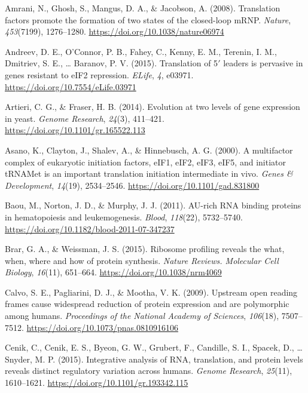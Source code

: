 \documentclass[12pt,openany]{book}
\begin{document}
\hypertarget{ref-Amrani2008}{}
Amrani, N., Ghosh, S., Mangus, D. A., \& Jacobson, A. (2008).
Translation factors promote the formation of two states of the
closed-loop mRNP. \emph{Nature}, \emph{453}(7199), 1276--1280.
\url{https://doi.org/10.1038/nature06974}

\hypertarget{ref-Andreev2015}{}
Andreev, D. E., O'Connor, P. B., Fahey, C., Kenny, E. M., Terenin, I.
M., Dmitriev, S. E., \ldots{} Baranov, P. V. (2015). Translation of
5\({'}\) leaders is pervasive in genes resistant to eIF2 repression.
\emph{ELife}, \emph{4}, e03971.
\url{https://doi.org/10.7554/eLife.03971}

\hypertarget{ref-Artieri2014}{}
Artieri, C. G., \& Fraser, H. B. (2014). Evolution at two levels of gene
expression in yeast. \emph{Genome Research}, \emph{24}(3), 411--421.
\url{https://doi.org/10.1101/gr.165522.113}

\hypertarget{ref-Asano2000}{}
Asano, K., Clayton, J., Shalev, A., \& Hinnebusch, A. G. (2000). A
multifactor complex of eukaryotic initiation factors, eIF1, eIF2, eIF3,
eIF5, and initiator tRNAMet is an important translation initiation
intermediate in vivo. \emph{Genes \& Development}, \emph{14}(19),
2534--2546. \url{https://doi.org/10.1101/gad.831800}

\hypertarget{ref-Baou2011}{}
Baou, M., Norton, J. D., \& Murphy, J. J. (2011). AU-rich RNA binding
proteins in hematopoiesis and leukemogenesis. \emph{Blood},
\emph{118}(22), 5732--5740.
\url{https://doi.org/10.1182/blood-2011-07-347237}

\hypertarget{ref-Brar2015}{}
Brar, G. A., \& Weissman, J. S. (2015). Ribosome profiling reveals the
what, when, where and how of protein synthesis. \emph{Nature Reviews.
Molecular Cell Biology}, \emph{16}(11), 651--664.
\url{https://doi.org/10.1038/nrm4069}

\hypertarget{ref-Calvo2009}{}
Calvo, S. E., Pagliarini, D. J., \& Mootha, V. K. (2009). Upstream open
reading frames cause widespread reduction of protein expression and are
polymorphic among humans. \emph{Proceedings of the National Academy of
Sciences}, \emph{106}(18), 7507--7512.
\url{https://doi.org/10.1073/pnas.0810916106}

\hypertarget{ref-Cenik2015}{}
Cenik, C., Cenik, E. S., Byeon, G. W., Grubert, F., Candille, S. I.,
Spacek, D., \ldots{} Snyder, M. P. (2015). Integrative analysis of RNA,
translation, and protein levels reveals distinct regulatory variation
across humans. \emph{Genome Research}, \emph{25}(11), 1610--1621.
\url{https://doi.org/10.1101/gr.193342.115}
\end{document}
